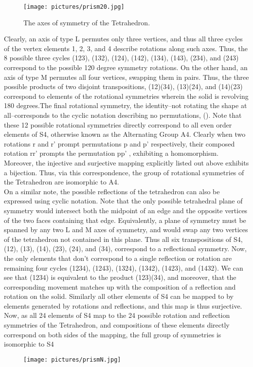 \documentclass{article}
\begin{document}
\begin{figure}[htp]
    \texttt{[image: pictures/prism20.jpg]}
    \caption{The axes of symmetry of the Tetrahedron.}
\end{figure}

Clearly, an axis of type L permutes only three vertices, and thus all three cycles of the vertex elements 1, 2, 3, and 4 describe rotations along such axes. Thus, the 8 possible three cycles (123), (132), (124), (142), (134), (143), (234), and (243) correspond to the possible 120 degree symmetry rotations. On the other hand, an axis of type M permutes all four vertices, swapping them in pairs. Thus, the three possible products of two disjoint transpositions, (12)(34), (13)(24), and (14)(23) correspond to elements of the rotational symmetries wherein the solid is revolving 180 degrees.The final rotational symmetry, the identity–not rotating the shape at all–corresponds to the cyclic notation describing no permutations, (). Note that these 12 possible rotational symmetries directly correspond to all even order elements of S4, otherwise known as the Alternating Group A4. Clearly when two rotations r and r' prompt permutations p and p' respectively, their composed rotation rr' prompts the permutation pp' , exhibiting a homomorphism. Moreover, the injective and surjective mapping explicitly listed out above exhibits a bijection. Thus, via this correspondence, the group of rotational symmetries of the Tetrahedron are isomorphic to A4.\\

On a similar note, the possible reflections of the tetrahedron can also be expressed using cyclic notation. Note that the only possible tetrahedral plane of symmetry would intersect both the midpoint of an edge and the opposite vertices of the two faces containing that edge. Equivalently, a plane of symmetry must be spanned by any two L and M axes of symmetry, and would swap any two vertices of the tetrahedron not contained in this plane. Thus all six transpositions of S4, (12), (13), (14), (23), (24), and (34), correspond to a reflectional symmetry. Now, the only elements that don’t correspond to a single reflection or rotation are remaining four cycles (1234), (1243), (1324), (1342), (1423), and (1432). We can see that (1234) is equivalent to the product (123)(34), and moreover, that the corresponding movement matches up with the composition of a reflection and rotation on the solid. Similarly all other elements of S4 can be mapped to by elements generated by rotations and reflections, and this map is thus surjective. Now, as all 24 elements of S4 map to the 24 possible rotation and reflection symmetries of the Tetrahedron, and compositions of these elements directly correspond on both sides of the mapping, the full group of symmetries is isomorphic to S4 \\
\begin{figure}[htp]
    \texttt{[image: pictures/prismN.jpg]}
\end{figure}\\
\vspace{11cm}
\end{document}
